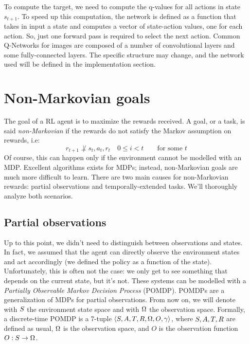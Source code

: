 To compute the target, we need to compute the q-values for all actions in
state $s_{t+1}$. To speed up this computation, the network is defined as a
function that takes in input a state and computes a vector of state-action
values, one for each action. So, just one forward pass is required to select
the next action. Common Q-Networks for images are composed of a number of
convolutional layers and some fully-connected layers. The specific structure
may change, and the network used will be defined in the implementation section.


\section{Non-Markovian goals}

\label{sec:non-markov}

The goal of a RL agent is to maximize the rewards received.  A goal, or a
task, is said \emph{non-Markovian} if the rewards do not satisfy the Markov
assumption on rewards, i.e:
\begin{equation}
	r_{t+1} \not\perp s_t, a_t, r_t \quad 0 \le i < t \qquad \text{for some $t$}
	\label{eq:markov-rewards}
\end{equation}
Of course, this can happen only if the environment cannot be modelled with an
MDP. Excellent algorithms exists for MDPs; instead, non-Markovian goals are
much more difficult to learn.  There are two main causes for non-Markovian
rewards: partial observations and temporally-extended tasks. We'll thoroughly
analyze both scenarios.


\subsection{Partial observations}

Up to this point, we didn't need to distinguish between observations and
states. In fact, we assumed that the agent can directly observe the
environment states and act accordingly (we defined the policy as a function of
the state). Unfortunately, this is often not the case: we only get to see
something that depends on the current state, but it's not. These systems can
be modelled with a \emph{Partially Observable Markov Decision Process}
(POMDP).  POMDPs are a generalization of MDPs for partial observations. From
now on, we will denote with $S$ the environment state space and with
$\Omega$ the observation space. Formally, a discrete-time POMDP is a 7-tuple
${\langle S, A, T, R, \Omega, O, \gamma \rangle}$, where $S, A,
T, R$ are defined as usual, $\Omega$ is the observation space, and $O$ is the
observation function ${O: S \to \Omega}$.

